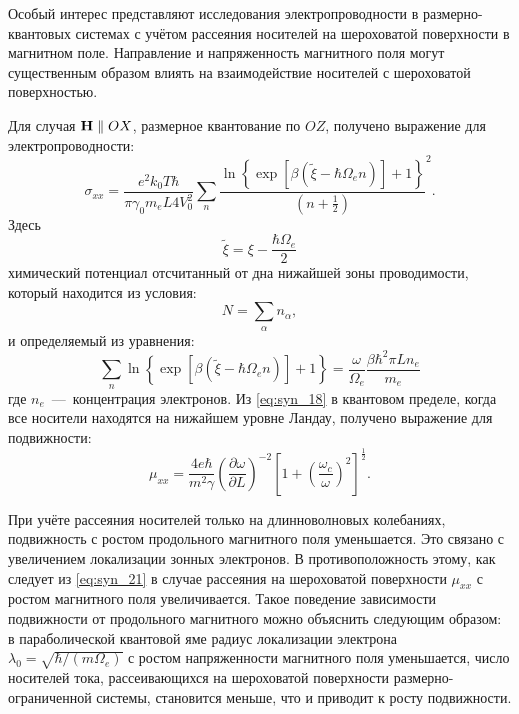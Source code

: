Особый интерес представляют исследования электропроводности в размерно-квантовых системах с учётом рассеяния носителей на шероховатой поверхности в магнитном поле. Направление и напряженность магнитного поля могут существенным образом влиять на взаимодействие носителей с шероховатой поверхностью. 

Для случая $\boldsymbol{\mathbf{H}} \parallel OX$, размерное квантование по $OZ$, получено выражение для электропроводности:
\begin{equation} \label{eq:syn_18}
\sigma_{xx} = \frac{e^2 k_0 T \hbar}{\pi \gamma_0 m_e L 4 V^2_0} \sum_n{\frac{\ln{\left\{\exp{\left[\beta \left(\widetilde{\xi}-\hbar \Omega_e n\right)\right]}+1\right\}}}{\left(n+\frac{1}{2}\right)}^2}. 
\end{equation}
Здесь
\[
\widetilde{\xi} = \xi -\frac{\hbar\Omega_e }{2}
\]
химический потенциал отсчитанный от дна нижайшей зоны проводимости, который находится из условия:
\begin{equation} \label{eq:syn_19}
N=\sum_{\alpha }{n_{\alpha}},
\end{equation}
и определяемый из уравнения:
\begin{equation} \label{eq:syn_20}
\sum_n{\ln{\left\{\exp{\left[\beta \left(\widetilde{\xi}-\hbar \Omega_e n\right)\right]}+1\right\}}}=\frac{\omega }{\Omega_e } \frac{\beta \hbar^2 \pi L n_e}{m_e}
\end{equation}
где $n_e$~---~концентрация электронов.
Из \eqref{eq:syn_18} в квантовом пределе, когда все носители находятся на нижайшем уровне Ландау, получено выражение для подвижности:
\begin{equation} \label{eq:syn_21}
\mu _{xx} =\frac{4e\hbar }{m^2 \gamma } \left(\frac{\partial \omega }{\partial L} \right)^{-2} \left[1+\left(\frac{\omega_c}{\omega } \right)^2 \right]^{\frac{1}{2} }.
\end{equation}

При учёте рассеяния носителей только на длинноволновых колебаниях, подвижность с ростом продольного магнитного поля уменьшается. Это связано с увеличением локализации зонных электронов. В противоположность этому, как следует из \eqref{eq:syn_21} в случае рассеяния на шероховатой поверхности $\mu_{xx} $ с ростом магнитного поля увеличивается. Такое поведение зависимости подвижности от продольного магнитного можно объяснить следующим образом: в параболической квантовой яме радиус локализации электрона $\lambda_0 =\sqrt{\hbar / (m\Omega_e) } $ с ростом напряженности магнитного поля уменьшается, число носителей тока, рассеивающихся на шероховатой поверхности размерно-ограниченной системы, становится меньше, что и приводит к росту подвижности.

